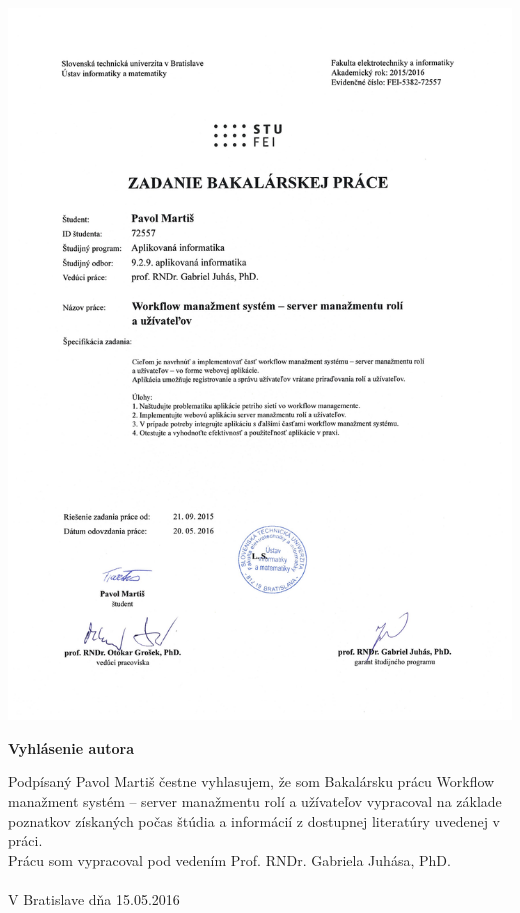 \documentclass[12pt, oneside]{book}
\begin{document}
\eject %





\newpage 
\thispagestyle{empty}
\hspace{-2cm}\includegraphics[width=1.1\textwidth]{images/zadanie}


\frontmatter


\setcounter{page}{3}
\newpage 
\pagestyle{empty}
\noindent
\vfill
\begin{center}
	\LARGE \textbf{Vyhlásenie autora}  \\
\end{center}
Podpísaný Pavol Martiš čestne vyhlasujem, že som Bakalársku prácu Workflow manažment systém – server manažmentu rolí a užívateľov vypracoval na základe poznatkov získaných počas štúdia a informácií z dostupnej literatúry uvedenej v práci.\\
Prácu som vypracoval pod vedením Prof. RNDr. Gabriela Juhása, PhD.\\\\
V Bratislave dňa 15.05.2016 \\\\
\end{document}
